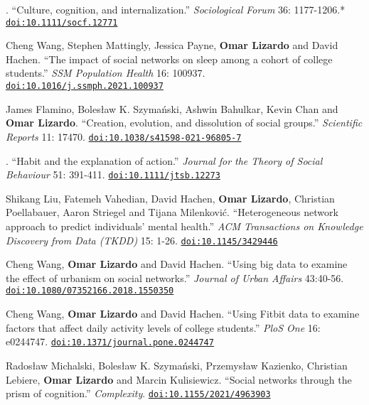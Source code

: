 
. ``Culture, cognition, and internalization.'' {\em Sociological Forum} 36: 1177-1206.\textcolor{uclablue}{*} \href{https://doi.org/10.1111/socf.12771}{\nolinkurl{doi:10.1111/socf.12771}}

\ind Cheng Wang, Stephen Mattingly, Jessica Payne, {\bf Omar Lizardo} and David Hachen. ``The impact of social networks on sleep among a cohort of college students.'' {\em SSM Population Health} 16: 100937. \href{https://doi.org/10.1016/j.ssmph.2021.100937}{\nolinkurl{doi:10.1016/j.ssmph.2021.100937}} 

\ind James Flamino, Boles\l{}aw K. Szyma\'{n}ski, Ashwin Bahulkar, Kevin Chan and {\bf Omar Lizardo}. ``Creation, evolution, and dissolution of social groups.'' {\em Scientific Reports} 11: 17470. \href{https://doi.org/10.1038/s41598-021-96805-7}{\nolinkurl{doi:10.1038/s41598-021-96805-7}} 

. ``Habit and the explanation of action.'' {\em Journal for the Theory of Social Behaviour} 51: 391-411. \href{https://doi.org/10.1111/jtsb.12273}{\nolinkurl{doi:10.1111/jtsb.12273}}

\ind Shikang Liu, Fatemeh Vahedian, David Hachen, {\bf Omar Lizardo}, Christian Poellabauer, Aaron Striegel and Tijana Milenkovi\'{c}. ``Heterogeneous network approach to predict individuals' mental health.'' {\em ACM Transactions on Knowledge Discovery from Data (TKDD)} 15: 1-26. \href{https://doi.org/10.1145/3429446}{\nolinkurl{doi:10.1145/3429446}}

\ind Cheng Wang, {\bf Omar Lizardo} and David Hachen. ``Using big data to examine the effect of urbanism on social networks.'' {\em Journal of Urban Affairs} 43:40-56. \href{https://doi.org/10.1080/07352166.2018.1550350}{\nolinkurl{doi:10.1080/07352166.2018.1550350}}

\ind Cheng Wang, {\bf Omar Lizardo} and David Hachen. ``Using Fitbit data to examine factors that affect daily activity levels of college students.'' {\em PloS One} 16: e0244747. \href{https://doi.org/10.1371/journal.pone.0244747}{\nolinkurl{doi:10.1371/journal.pone.0244747}}

\ind Rados\l{}aw Michalski, Boles\l{}aw K. Szyma\'{n}ski, Przemys\l{}aw Kazienko, Christian Lebiere, {\bf Omar Lizardo} and Marcin Kulisiewicz. ``Social networks through the prism of cognition.'' {\em Complexity}. \href{https://doi.org/10.1155/2021/4963903}{\nolinkurl{doi:10.1155/2021/4963903}}
\medskip








